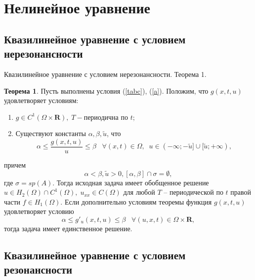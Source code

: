 \documentclass[ignorenonframetext,unicode,handout, 9pt]{beamer}
\numberwithin{equation}{section}
\begin{document}

\section{Нелинейное уравнение}
\subsection{Квазилинейное уравнение с условием  нерезонансности}

\begin{frame}{Квазилинейное уравнение с условием  нерезонансности. Теорема 1.}

\textbf{Теорема 1}.
Пусть выполнены условия (\ref{tabc}), (\ref{a}). Положим, что $g(x,t,u)$ удовлетворяет условиям:
\begin{enumerate}
  \item $g \in C^1(\Omega \times \textbf{R}), \; T-$периодична по $t$;
  \item Существуют константы $\alpha, \beta, \widetilde{u}$, что
  \begin{equation}\label{enenf}
    \alpha \leqslant \frac{g(x,t,u)}{u} \leqslant \beta \;\;\; \forall (x,t) \in \Omega, \;\; u \in (-\infty; -\widetilde{u}] \cup [\widetilde{u}; +\infty),
  \end{equation}
\end{enumerate}
причем
\begin{equation}\label{con}
  \alpha < \beta, \widetilde{u} > 0, [\alpha,\beta] \cap \sigma = \emptyset,
\end{equation}
где $\sigma = sp(A)$. Тогда исходная задача  имеет обобщенное решение $u \in H_2(\Omega)\cap C^1(\Omega), \; u_{xx} \in C(\Omega)$ для любой $T$ --  периодической по $t$ правой части $f \in H_1(\Omega)$. Если дополнительно условиям теоремы функция $g(x,t,u)$ удовлетворяет условию
\begin{equation}\label{42}
  \alpha \leqslant g'_u(x,t,u) \leqslant \beta \;\; \; \forall (u,x,t) \in \Omega \times \textbf{R},
\end{equation}
тогда  задача  имеет единственное решение.

\end{frame}



\subsection{Квазилинейное уравнение с условием  резонансности}
\end{document}
